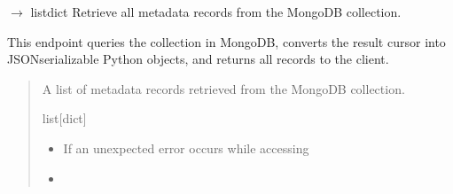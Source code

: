 \documentclass[letterpaper,10pt,english]{sphinxmanual}
\begin{document}

\begin{fulllineitems}
\label{\detokenize{modules/src.pig_sorting_api.main:src.pig_sorting_api.main.get_mongo_data}}
\pysigstartsignatures
\pysiglinewithargsret
{}
{}
{{ $\rightarrow$ list\DUrole{p}{{[}}dict\DUrole{p}{{]}}}}
\pysigstopsignatures
\sphinxAtStartPar
Retrieve all metadata records from the MongoDB collection.

\sphinxAtStartPar
This endpoint queries the  collection in MongoDB,
converts the result cursor into JSON\sphinxhyphen{}serializable Python objects,
and returns all records to the client.
\begin{quote}\begin{description}
\sphinxAtStartPar
A list of metadata records retrieved from the
 MongoDB collection.

\sphinxAtStartPar
list{[}dict{]}

\begin{itemize}
\item {} 
\sphinxAtStartPar
{} \textendash{} If an unexpected error occurs while accessing

\item {} 
\sphinxAtStartPar
{} \textendash{} 

\end{itemize}

\end{description}\end{quote}

\end{fulllineitems}

\end{document}
